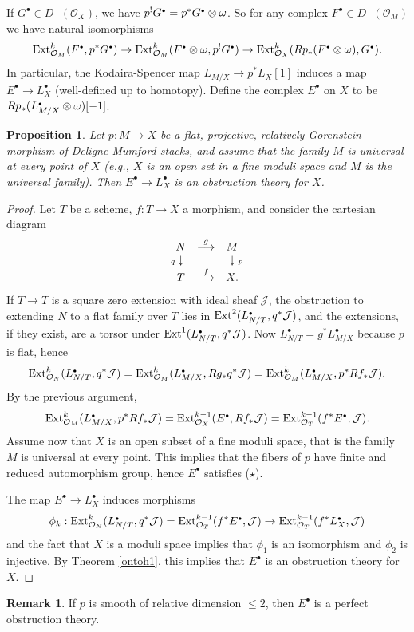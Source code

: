 \documentclass[11pt]{article}
\theoremstyle{plain}
\newtheorem{prop}{Proposition}[section]
\theoremstyle{definition}
\newtheorem{rmkp}{Remark}\renewcommand{\thermkp}{}
\newenvironment{rmk}{\begin{rmkp}\normalfont}{\end{rmkp}}
\newenvironment{pf}{\begin{proof}}{\end{proof}}
\newcommand{\upst}{^{\ast}}
\newcommand{\upsh}{^{!}}
\newcommand{\lst}{_{\ast}}
\newcommand{\com}{^{\scriptscriptstyle\bullet}}
\renewcommand{\O}{{\mathcal{O}}}
\newcommand{\jJ}{{\mathcal{J}}}
\newcommand{\ldiag}[1]
       {\makebox[0cm]{\({\scriptstyle#1}\downarrow\phantom{\scriptstyle#1}\)}}
\newcommand{\rdiag}[1]
       {\makebox[0cm]{\(\phantom{\scriptstyle#1}\downarrow{\scriptstyle#1}\)}}
\newcommand{\comdia}[9]{
\begin{array}{ccc}
#1 & \stackrel{#2}{\longrightarrow} & #3 \\
\ldiag{#4} & #5 & \rdiag{#6} \\
#7 & \stackrel{#8}{\longrightarrow} & #9
\end{array}}
\theoremstyle{plain}
\theoremstyle{definition}
\theoremstyle{remark}
\begin{document}
If \(G\com\in D^+(\O_X)\), we have \(p\upsh G\com=p\upst G\com\otimes \reldu\). So
for any complex \(F\com\in D^-(\O_M)\) we have natural isomorphisms
\[
\eext^k_{\O_M}(F\com,p\upst G\com)\to
 \eext^k_{\O_M}(F\com\otimes \reldu,p\upsh G\com)\to
\eext^k_{\O_X}(Rp\lst (F\com \otimes \reldu), G\com).
\]
In particular, the Kodaira-Spencer map
\(L_{M/X}\to p^*L_X[1]\) induces a map
\(E\com\to L\com_X\) (well-defined up to homotopy). Define the complex
\(E\com\) on
\(X\) to be
\(Rp_*(L\com_{M/X}\otimes \reldu)[-1]\).


\begin{prop} Let \(p:M\to X\) be a flat, projective, relatively Gorenstein
morphism of
Deligne-Mumford stacks, and assume that the family \(M\) is universal at every
point
of \(X\) (e.g., \(X\) is an open set in a fine moduli space and \(M\) is the
universal
family). Then \(E\com\to L_X\com\) is an obstruction theory for \(X\).
\end{prop}
\begin{pf}
Let \(T\) be a scheme, \(f:T\to X\) a morphism, and consider the cartesian
diagram
\[
\comdia{N}{g}{M}{q}{}{p}{T}{f}{X.}
\]
If \(T\to \bar T\) is a square zero extension with ideal sheaf \(\jJ\), the
obstruction to extending \(N\) to a flat family over \(\bar T\) lies in
\(\eext^2(L\com_{N/T},q^*\jJ)\), and the extensions, if they exist, are a torsor
under \(\eext^1(L\com_{N/T},q^*\jJ)\).
Now \(L\com_{N/T}=g^*L\com_{M/X}\) because \(p\) is flat, hence
\[
\eext^k_{\O_N}(L\com_{N/T},q^*\jJ)=\eext^k_{\O_M}(L\com_{M/X},Rg_*q^*\jJ)=
\eext^k_{\O_M}(L\com_{M/X},p^*Rf_*\jJ).
\]
By the
previous
argument,
\[
\eext^k_{\O_M}(L\com_{M/X},p^*Rf_*\jJ)=\eext^{k-1}_{\O_X}(E\com,Rf_*\jJ)=
\eext^{k-1}_{\O_T}(f^*E\com,\jJ).
\]
Assume now that \(X\) is an open subset of a fine moduli space,
that is the family \(M\) is universal at every point. This implies that
the fibers of \(p\) have finite and reduced automorphism group, hence
\(E\com\) satisfies (\(\star\)).


The map \(E\com\to L_X\com\) induces morphisms
\[
\phi_k:\eext^k_{\O_N}(L\com_{N/T},q^*\jJ)=\eext^{k-1}_{\O_T}(f^*E\com,\jJ)
\to\eext^{k-1}_{\O_T}(f^*L\com_{X},\jJ)
\]
and the fact that \(X\) is a moduli
space
implies that
\(\phi_1\) is an isomorphism
and \(\phi_2\) is
injective. By Theorem \ref{ontoh1}, this implies that \(E\com\)
is an obstruction theory for \(X\).
\end{pf}
\begin{rmk} If \(p\) is smooth of relative dimension \(\le 2\), then \(E\com\) is a
perfect
obstruction theory.
\end{rmk}
\end{document}
